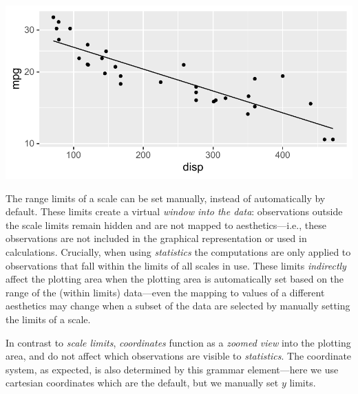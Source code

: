 \documentclass[krantz2]{krantz}\usepackage{knitr}
\begin{document}
\begin{knitrout}\footnotesize
{}\color{fgcolor}\begin{kframe}
\begin{alltt}
\hlstd{(} 
       \hlstd{(}    \hlopt{+}
  \hlstd{()} \hlopt{+}
  \hlstd{(} \hlstd{=} \hlstd{,}  \hlstd{=} \hlstd{,}   \hlopt{~}  \hlopt{+}
  \hlstd{()}
\end{alltt}
\end{kframe}

{\centering \includegraphics[width=.7\textwidth]{figure/pos-ggplot-basics-06-1} 

}


\end{knitrout}

The range limits of a scale can be set manually, instead of automatically by default. These limits create a virtual \emph{window into the data}: observations outside the scale limits remain hidden and are not mapped to aesthetics---i.e., these observations are not included in the graphical representation or used in calculations. Crucially, when using \emph{statistics} the computations are only applied to observations that fall within the limits of all scales in use. These limits \emph{indirectly} affect the plotting area when the plotting area is automatically set based on the range of the (within limits) data---even the mapping to values of a different aesthetics may change when a subset of the data are selected by manually setting the limits of a scale.

In contrast to \emph{scale limits}, \emph{coordinates} function as a \emph{zoomed view} into the plotting area, and do not affect which observations are visible to \emph{statistics}. The coordinate system, as expected, is also determined by this grammar element---here we use cartesian coordinates which are the default, but we manually set $y$ limits.
\end{document}
